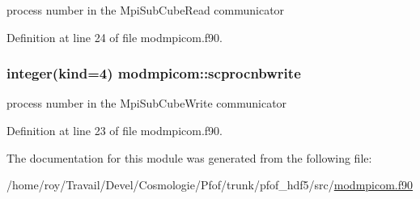 process number in the Mpi\-Sub\-Cube\-Read communicator 



Definition at line 24 of file modmpicom.\-f90.

\hypertarget{classmodmpicom_a8281c8567826b44d76d7a801203c99a8}{
\subsubsection[{scprocnbwrite}]{\setlength{\rightskip}{0pt plus 5cm}integer(kind=4) modmpicom\-::scprocnbwrite}}\label{classmodmpicom_a8281c8567826b44d76d7a801203c99a8}


process number in the Mpi\-Sub\-Cube\-Write communicator 



Definition at line 23 of file modmpicom.\-f90.



The documentation for this module was generated from the following file\-:\begin{DoxyCompactItemize}
\item 
/home/roy/\-Travail/\-Devel/\-Cosmologie/\-Pfof/trunk/pfof\-\_\-hdf5/src/\hyperlink{pfof__hdf5_2src_2modmpicom_8f90}{modmpicom.\-f90}\end{DoxyCompactItemize}
